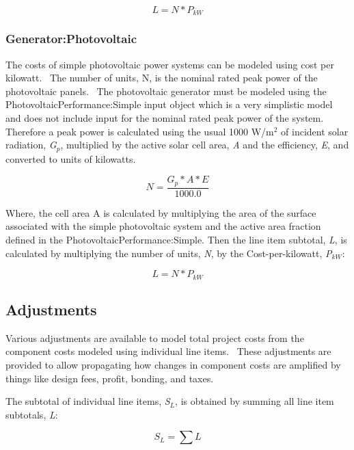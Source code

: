 \begin{equation}
L = N * {P_{kW}}
\end{equation}

\subsubsection{Generator:Photovoltaic}\label{generatorphotovoltaic}

The costs of simple photovoltaic power systems can be modeled using cost per kilowatt.~ The number of units, N, is the nominal rated peak power of the photovoltaic panels.~ The photovoltaic generator must be modeled using the PhotovoltaicPerformance:Simple input object which is a very simplistic model and does not include input for the nominal rated peak power of the system.~ Therefore a peak power is calculated using the usual 1000 W/m\(^{2}\) of incident solar radiation, \emph{G\(_{p}\)}, multiplied by the active solar cell area, \emph{A} and the efficiency, \emph{E}, and converted to units of kilowatts.

\begin{equation}
N = \frac{{{G_p} * A * E}}{{1000.0}}
\end{equation}

Where, the cell area A is calculated by multiplying the area of the surface associated with the simple photovoltaic system and the active area fraction defined in the PhotovoltaicPerformance:Simple. Then the line item subtotal, \emph{L}, is calculated by multiplying the number of units, \emph{N}, by the Cost-per-kilowatt, \emph{P\(_{kW}\)}:

\begin{equation}
L = N * {P_{kW}}
\end{equation}

\subsection{Adjustments}\label{adjustments}

Various adjustments are available to model total project costs from the component costs modeled using individual line items.~ These adjustments are provided to allow propagating how changes in component costs are amplified by things like design fees, profit, bonding, and taxes.

The subtotal of individual line items, \emph{S\(_{L}\)}, is obtained by summing all line item subtotals, \emph{L}:

\begin{equation}
{S_L} = \sum L
\end{equation}

